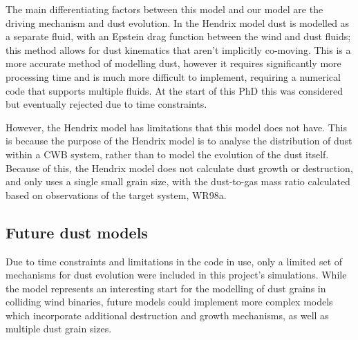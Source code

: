 
The main differentiating factors between this model and our model are the driving mechanism and dust evolution.
In the Hendrix model dust is modelled as a separate fluid, with an Epstein drag function between the wind and dust fluids; this method allows for dust kinematics that aren't implicitly co-moving.
This is a more accurate method of modelling dust, however it requires significantly more processing time and is much more difficult to implement, requiring a numerical code that supports multiple fluids.
At the start of this PhD this was considered but eventually rejected due to time constraints.

However, the Hendrix model has limitations that this model does not have.
This is because the purpose of the Hendrix model is to analyse the distribution of dust within a CWB system, rather than to model the evolution of the dust itself.
Because of this, the Hendrix model does not calculate dust growth or destruction, and only uses a single small grain size, with the dust-to-gas mass ratio calculated based on observations of the target system, WR98a.

\subsection{Future dust models}


Due to time constraints and limitations in the code in use, only a limited set of mechanisms for dust evolution were included in this project's simulations.
While the \bidmas{} model represents an interesting start for the modelling of dust grains in colliding wind binaries, future models could implement more complex models which incorporate additional destruction and growth mechanisms, as well as multiple dust grain sizes.

